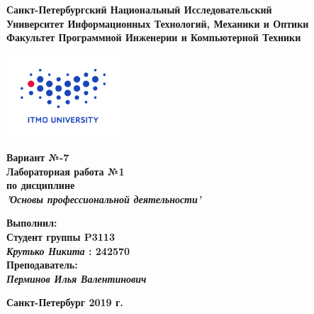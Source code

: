 \documentclass[11pt]{article}
\author{Крутько Никита}
\date{\today}
\title{}
\begin{document}
\thispagestyle{empty}
\large
\newfontfamily{}
\newfontfamily{}
\lstset{
  frame = shadowbox,
  commentstyle = \lstcomment\it\small,
  basicstyle = \lstbasic\small,
  numberstyle = \lstbasic\tiny,numbers=left,
  stringstyle = \lstbasic\it\small,
}
\begin{center}
\textbf{Санкт-Петербургский Национальный Исследовательский}\\
\textbf{Университет Информационных Технологий, Механики и Оптики}\\
\textbf{Факультет Программной Инженерии и Компьютерной Техники}\\
\end{center}
\vspace{1em}
\begin{center}
\includegraphics[width=120pt]{./itmo-logo.png}
\end{center}
\LARGE
\vspace{5em}
\begin{center}
\textbf{Вариант №-7}\\
\textbf{Лабораторная работа №1}\\
\Large
\textbf{по дисциплине}\\
\LARGE
\textbf{\emph{'Основы профессиональной деятельности'}}\\
\end{center}
\vspace{11em}
\large
\begin{flushright}
\textbf{Выполнил:}\\
\textbf{Студент группы P3113}\\
\textbf{\emph{Крутько Никита} : 242570}\\
\textbf{Преподаватель:}\\
\textbf{\emph{Перминов Илья Валентинович}}\\
\end{flushright}
\vspace{4em}
\large
\begin{center}
\textbf{Санкт-Петербург 2019 г.}
\end{center}
\pagebreak{}
\setcounter{tocdepth}{2}
\tableofcontents
\vspace{2em}
\end{document}
